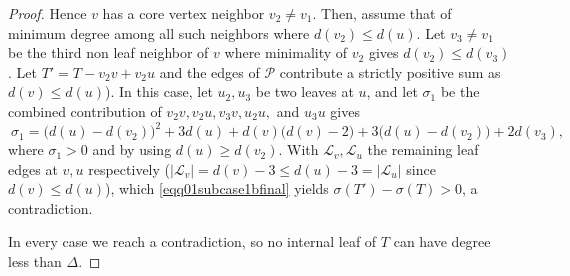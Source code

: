 \documentclass[10pt,a4paper]{amsart}
\begin{document}
\begin{proof}
Hence $v$ has a core vertex neighbor $v_2\ne v_1$. Then, assume that of minimum degree
among all such neighbors where $d(v_2)\leqslant d(u)$.
Let $v_3\ne v_1$ be the third non leaf neighbor of $v$ where minimality of $v_2$
gives $d(v_2)\le d(v_3)$. Let $T'=T-v_2v+v_2u$ and the edges of $\mathcal P$ contribute a
strictly positive sum  as $d(v)\leqslant d(u)$). In this case, let $u_2,u_3$ be two leaves at $u$, and let $\sigma_1$ be the combined contribution of $v_2v, v_2u, v_3v, u_2u,$ and $u_3u$ gives
\begin{equation}~\label{eqq001subcase2bsigma1}
\sigma_1 = \big(d(u)-d(v_2)\big)^2+3d(u)+d(v)\big(d(v)-2\big)
+3\big(d(u)-d(v_2)\big)+2d(v_3),
\end{equation}
where $\sigma_1>0$ and by using $d(u)\geqslant d(v_2)$. With $\mathcal L_v,\mathcal L_u$ the remaining leaf edges at $v,u$
respectively ($|\mathcal L_v|=d(v)-3\leqslant d(u)-3=|\mathcal L_u|$ since $d(v)\leqslant d(u)$), which \eqref{eqq01subcase1bfinal} yields
$\sigma(T')-\sigma(T)>0$, a contradiction.

In every case we reach a contradiction, so no internal leaf of $T$ can have
degree less than $\Delta$.
\end{proof}
\end{document}
